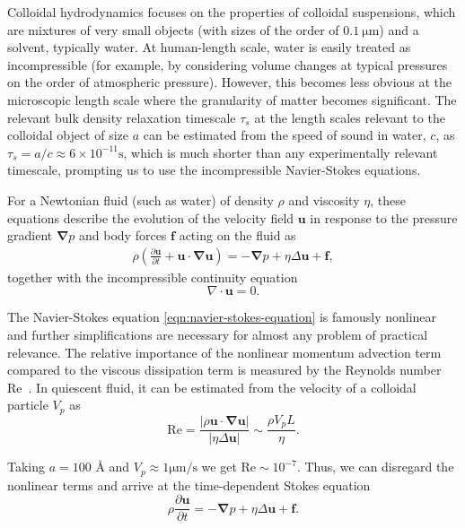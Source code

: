 \documentclass{doctoral}
\newcommand{\pd}{\partial}
\newcommand{\Reynolds}{\mathrm{Re}}
\begin{document}
Colloidal hydrodynamics focuses on the properties of colloidal suspensions, which are mixtures of very small objects (with sizes of the order of $0.1\ \mathrm{\mu m}$) and a solvent, typically water.
At human-length scale, water is easily treated as incompressible (for example, by considering volume changes at typical pressures on the order of atmospheric pressure).
However, this becomes less obvious at the microscopic length scale where the granularity of matter becomes significant.
The relevant bulk density relaxation timescale $\tau_s$ at the length scales relevant to the colloidal object of size $a$ can be estimated from the speed of sound in water, $c$, as $\tau_s = a/c \approx 6 \times 10^{-11} \mathrm{s}$, which is much shorter than any experimentally relevant timescale, prompting us to use the incompressible Navier-Stokes equations.

For a Newtonian fluid (such as water) of density $\rho$ and viscosity $\eta$, these equations describe the evolution of the velocity field $\bm{u}$ in response to the pressure gradient $\bm{\nabla} p$ and body forces $\bm{f}$ acting on the fluid as
\begin{eqnarray}
    \rho \left( \frac{\pd \bm{u}}{\pd t} + \bm{u} \cdot \bm{\nabla u} \right) = - \bm{\nabla} p + \eta \Delta \bm{u} + \bm{f}, \label{eqn:navier-stokes-equation}
\end{eqnarray}
together with the incompressible continuity equation
\begin{equation}
    \nabla \cdot \bm{u} = 0 \label{eqn:incompressibility}.
\end{equation}

The Navier-Stokes equation \eqref{eqn:navier-stokes-equation} is famously nonlinear and further simplifications are necessary for almost any problem of practical relevance.
The relative importance of the nonlinear momentum advection term compared to the viscous dissipation term is measured by the Reynolds number $\Reynolds$~\cite{Reynolds_1883}.
In quiescent fluid, it can be estimated from the velocity of a colloidal particle $V_p$ as
\begin{equation}
    \Reynolds = \frac{|\rho \bm{u} \cdot \bm{\nabla}\bm{u}|}{|\eta \Delta \bm{u}|} \sim \frac{\rho V_p L}{\eta}.
    \label{eqn:reynolds-based-estimate}
\end{equation}

Taking $a = 100$ \AA{} and $V_p \approx 1 \mathrm{\mu m / s}$  we get $\Reynolds \sim 10^{-7}$.
Thus, we can disregard the nonlinear terms and arrive at the time-dependent Stokes equation
\begin{equation}
    \rho \frac{\pd \bm{u}}{\pd t} = - \bm{\nabla} p + \eta \Delta \bm{u} + \bm{f}.
    \label{eqn:time-dependent-stokes-equation}
\end{equation}
\end{document}
